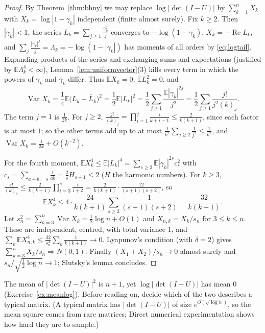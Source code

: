 \begin{proof}
By Theorem~\ref{thm:bhny} we may replace $\log|\det(I-U)|$ by $\sum_{k=1}^nX_k$ with $X_k=\log|1-\gamma_k|$ independent (finite almost surely). Fix $k\ge2$. Then $|\gamma_k|<1$, the series $L_k=\sum_{j\ge1}\frac{\gamma_k^j}j$ converges to
$-\log(1-\gamma_k)$, $X_k=-\operatorname{Re}L_k$, and $\sum_j\frac{|\gamma_k|^j}j=\Lambda_k=-\log(1-|\gamma_k|)$ has moments of all orders by \eqref{eq:logtail}. Expanding products of the series and exchanging sums and expectations (justified by
$\mathbb E\Lambda_k^4<\infty$), Lemma~\ref{lem:uniformvector}(3) kills every term in which the powers of $\gamma_k$ and $\bar\gamma_k$ differ. Thus $\mathbb EX_k=0$, $\mathbb EL_k^2=0$, and
\[
\operatorname{Var}X_k=\frac14\mathbb E\bigl(L_k+\bar L_k\bigr)^2=\frac12\mathbb E|L_k|^2=\frac12\sum_{j\ge1}\frac{\mathbb E|\gamma_k|^{2j}}{j^2}=\frac12\sum_{j\ge1}\frac{j!}{j^2(k)_j}.
\]
The term $j=1$ is $\frac1{2k}$. For $j\ge2$, $\frac{j!}{(k)_j}=\prod_{i=1}^j\frac i{k+i-1}\le\frac2{k(k+1)}$, since each factor is at most $1$; so the other terms add up to at most $\frac1{k^2}\sum_{j\ge2}\frac1{j^2}\le\frac1{k^2}$, and $\operatorname{Var}X_k=\frac1{2k}+O(k^{-2})$.

For the fourth moment, $\mathbb EX_k^4\le\mathbb E|L_k|^4=\sum_{s\ge2}\mathbb E|\gamma_k|^{2s}c_s^2$ with $c_s=\sum_{a+b=s}\frac1{ab}=\frac2sH_{s-1}\le2$ ($H$ the harmonic numbers). For $k\ge3$, $\frac{s!}{(k)_s}\le\frac2{k(k+1)}\prod_{i=3}^s\frac i{i+2}=\frac2{k(k+1)}\cdot\frac{12}{(s+1)(s+2)}$, so
\[
\mathbb EX_k^4\le4\cdot\frac{24}{k(k+1)}\sum_{s\ge2}\frac1{(s+1)(s+2)}=\frac{32}{k(k+1)}.
\]
Let $s_n^2=\sum_{k=3}^n\operatorname{Var}X_k=\frac12\log n+O(1)$ and $X_{n,k}=X_k/s_n$ for $3\le k\le n$. These are independent, centred, with total variance $1$, and $\sum_k\mathbb EX_{n,k}^4\le\frac{32}{s_n^4}\sum_k\frac1{k(k+1)}\to0$. Lyapunov's condition
(with $\delta=2$) gives $\sum_{k=3}^nX_k/s_n\Rightarrow N(0,1)$. Finally $(X_1+X_2)/s_n\to0$ almost surely and $s_n/\sqrt{\frac12\log n}\to1$; Slutsky's lemma concludes.
\end{proof}

\begin{think}
The mean of $|\det(I-U)|^2$ is $n+1$, yet $\log|\det(I-U)|$ has mean $0$ (Exercise~\ref{ex:meanlog}). Before reading on, decide which of the two describes a typical matrix. (A typical matrix has $|\det(I-U)|$ of size $e^{O(\sqrt{\log n})}$, so the mean square comes from rare matrices; Direct numerical experimentation shows how hard they are to sample.)
\end{think}

